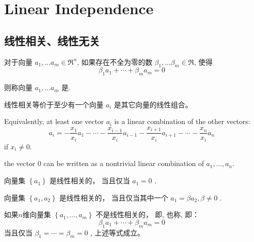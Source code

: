 \chapter{Linear Independence}

\section{线性相关、线性无关}

\begin{definition}
    对于向量 $ a_{1}, \ldots a_{m} \in \mathfrak{R}^{n} $, 如果存在不全为零的数 $ \beta_{1}, \ldots \beta_{m} \in \mathfrak{R} $, 使得
\begin{equation}
\beta_{1} a_{1}+\cdots+\beta_{m} a_{m}=0
\end{equation}

则称向量 $ a_{1}, \ldots a_{m} $ 是. 
\end{definition}

\begin{corollary}
    线性相关等价于至少有一个向量 $ a_{i} $ 是其它向量的线性组合。 

    Equivalently, at least one vector $ a_{i} $ is a linear combination of the other vectors:
\begin{equation}
a_{i}=-\frac{x_{1}}{x_{i}} a_{1}-\cdots-\frac{x_{i-1}}{x_{i}} a_{i-1}-\frac{x_{i+1}}{x_{i}} a_{i+1}-\cdots-\frac{x_{n}}{x_{i}} a_{n}
\end{equation}
if $ x_{i} \neq 0 $.
\end{corollary}


\begin{corollary}
    the vector $0$ can be written as a nontrivial linear combination of $ a_{1}, \ldots, a_{n} $.
\end{corollary}


\begin{corollary}
    向量集 $ \left\{a_{1}\right\} $ 是线性相关的， 当且仅当 $ a_{1}=0 $ . 
\end{corollary}
\begin{corollary}
    向量集 $ \left\{a_{1}, a_{2}\right\} $ 是线性相关的，  当且仅当其中一个 $ a_{1}=\beta a_{2}, \beta \neq 0 $ . 
\end{corollary}

\begin{definition}
    \label{Def:LinearIndependence}
    如果$n$维向量集 $ \left\{a_{1}, \ldots, a_{m}\right\} $ 不是线性相关的， 即, 也称,  即：
\begin{equation}
\beta_{1} a_{1}+\cdots+\beta_{m} a_{m}=0
\end{equation}
当且仅当 $ \beta_{1}=\cdots=\beta_{m}=0 $ , 上述等式成立。 
\end{definition}

